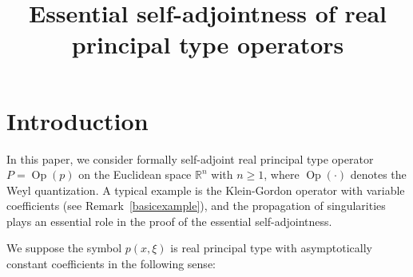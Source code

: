 \documentclass[AHL,Unicode,longabstracts,published]{cedram}
\title[Essential self-adjointness of real principal type operators]{Essential self-adjointness of real principal type operators}
\author[\initial{S.} \lastname{Nakamura}]{\firstname{Shu} \lastname{Nakamura}}
\author[\initial{K.} \lastname{Taira}]{\firstname{Kouichi} \lastname{Taira}}
\newcommand*\x{\xi}
\DeclareMathOperator{\Op}{Op}
\newcommand*\re{\mathbb{R}}
\newcommand*\pa{\partial}
\begin{document}
\maketitle

\section{Introduction}
In this paper, we consider formally self-adjoint real principal type operator $P=\Op(p)$ on the Euclidean space $\re^n$ with $n\geq 1$, where $\Op(\cdot)$ denotes the Weyl quantization. A typical example is the Klein-Gordon operator with variable coefficients (see Remark~\ref{basicexample}), and the propagation of singularities plays an essential role in the proof of the essential self-adjointness.

We suppose the symbol $p(x,\x)$ is real principal type with asymptotically constant coefficients in the following sense:

\end{document}

